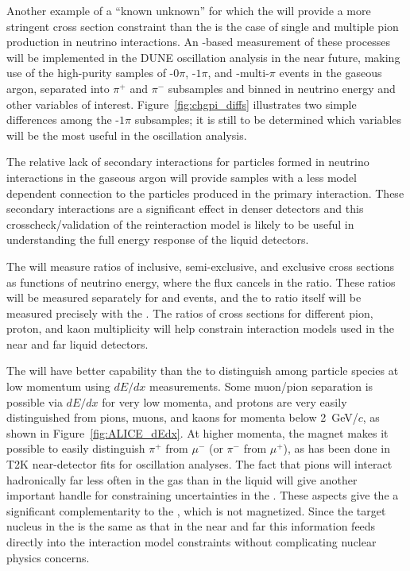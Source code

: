 \begin{itemize}
{Another example of a ``known unknown'' for which the  will provide a more stringent cross section constraint than the  is the case of single and multiple pion production in  neutrino interactions. An -based measurement of these processes will be implemented in the DUNE  oscillation analysis in the near future, making use of the high-purity samples of -$0\pi$, -$1\pi$, and -multi-$\pi$ events in the gaseous argon, separated into $\pi^+$ and $\pi^-$ subsamples and binned in neutrino energy and other variables of interest. Figure~\ref{fig:chgpi_diffs} illustrates two simple differences among the  -$1\pi$ subsamples; it is still to be determined which variables will be the most useful in the  oscillation analysis.

The relative lack of secondary interactions for particles formed in neutrino interactions in the gaseous argon  will provide samples with a less model dependent connection to the particles produced in the primary interaction.  These secondary interactions are a significant effect in denser detectors \cite{Friedland:2018vry} and this crosscheck/validation of the reinteraction model is likely to be useful in understanding the full energy response of the liquid detectors.   


The  will  measure ratios of inclusive, semi-exclusive, and exclusive cross sections as functions of neutrino energy, where the flux cancels in the ratio. These ratios will be measured separately for  and  events, and the  to  ratio itself will be measured precisely with the .  The ratios of cross sections for different pion, proton, and kaon multiplicity will help constrain interaction models used in the near and far liquid detectors.

The  will have better capability than the  to distinguish among particle species at low momentum using $dE/dx$ measurements.  Some muon/pion separation is possible via $dE/dx$ for very low momenta, and protons are very easily distinguished from pions, muons, and kaons for momenta below 2~GeV/$c$, as shown in Figure~\ref{fig:ALICE_dEdx}.  At higher momenta, the magnet makes it possible to easily distinguish $\pi^+$ from $\mu^-$ (or $\pi^-$ from $\mu^+$), as has been done in T2K near-detector fits for oscillation analyses. The fact that pions will interact hadronically far less often in the gas than in the liquid will give another important handle for constraining uncertainties in the .  These aspects give the  a significant complementarity to the , which is not magnetized.
Since the target nucleus in the  is the same as that in the near and far  this information feeds directly into the interaction model constraints without complicating nuclear physics concerns.

}
\end{itemize}
